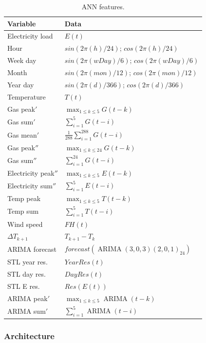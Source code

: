 \documentclass{sig-alternate-sigmod07}
\begin{document}
\begin{table}
\centering
\label{tab:ANNinputs}
\begin{tabular}{ll} \hline
Variable			& Data\\ \hline
Electricity load 		& $E(t)$ \\ 
Hour				& $sin(2\pi(h)/24)$; $cos(2\pi(h)/24)$\\
Week day			& $sin(2\pi(wDay)/6)$; $cos(2\pi(wDay)/6)$ \\
Month			& $sin(2\pi(mon)/12)$; $cos(2\pi(mon)/12)$ \\
Year day			& $sin(2\pi(d)/366)$; $cos(2\pi(d)/366)$ \\
Temperature		& $T(t)$ \\
Gas peak$'$		& $\max_{1 \leq k \leq 5}G(t-k)$ \\
Gas sum$'$		& $\sum_{i=1}^{5} G(t-i)$ \\
Gas mean$'$		& $\frac{1}{288}\sum_{i=1}^{288} G(t-i)$ \\
Gas peak$''$		& $\max_{1 \leq k \leq 24}G(t-k)$ \\
Gas sum$''$		& $\sum_{i=1}^{24} G(t-i)$ \\
Electricity peak$''$	& $\max_{1 \leq k \leq 5}E(t-k)$ \\
Electricity sum$''$	& $\sum_{i=1}^{5} E(t-i)$ \\
Temp peak			& $\max_{1 \leq k \leq 5}T(t-k)$ \\
Temp sum			& $\sum_{i=1}^{5} T(t-i)$ \\
Wind speed		& $FH(t)$ \\
$\Delta T_{k+1}$	& $T_{k+1} - T_{k}$ \\
ARIMA forecast		& $forecast(\operatorname{ARIMA}(3,0,3)(2,0,1)_{24})$ \\
STL year res.		& $YearRes(t)$ \\
STL day res.		& $DayRes(t)$ \\
STL E res.			& $Res(E(t))$ \\
ARIMA peak$'$		& $\max_{1 \leq k \leq 5}\operatorname{ARIMA}(t-k)$ \\
ARIMA sum$'$		& $\sum_{i=1}^{5} \operatorname{ARIMA}(t-i)$ \\
\hline
\end{tabular}
\caption{ANN features.}
\end{table}



\subsubsection{Architecture}
\end{document}
